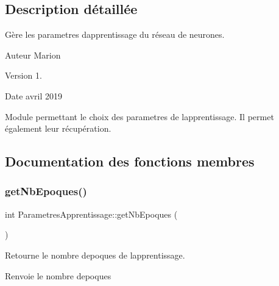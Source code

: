 \subsection{Description détaillée}
Gère les parametres d\textquotesingle{}apprentissage du réseau de neurones. 

\begin{DoxyAuthor}{Auteur}
Marion 
\end{DoxyAuthor}
\begin{DoxyVersion}{Version}
1. 
\end{DoxyVersion}
\begin{DoxyDate}{Date}
avril 2019
\end{DoxyDate}
Module permettant le choix des parametres de l\textquotesingle{}apprentissage. Il permet également leur récupération. 

\subsection{Documentation des fonctions membres}
\mbox{\label{classParametresApprentissage_ad4342b1543901201ad28b1da5c11dc26}} 
\subsubsection{\texorpdfstring{get\+Nb\+Epoques()}{getNbEpoques()}}
{\footnotesize\ttfamily int Parametres\+Apprentissage\+::get\+Nb\+Epoques (\begin{DoxyParamCaption}{ }\end{DoxyParamCaption})}



Retourne le nombre d\textquotesingle{}epoques de l\textquotesingle{}apprentissage. 

\begin{DoxyReturn}{Renvoie}
le nombre d\textquotesingle{}epoques 
\end{DoxyReturn}
\mbox{\label{classParametresApprentissage_aa5b6d225498ee1270996ace135745fdd}} 
